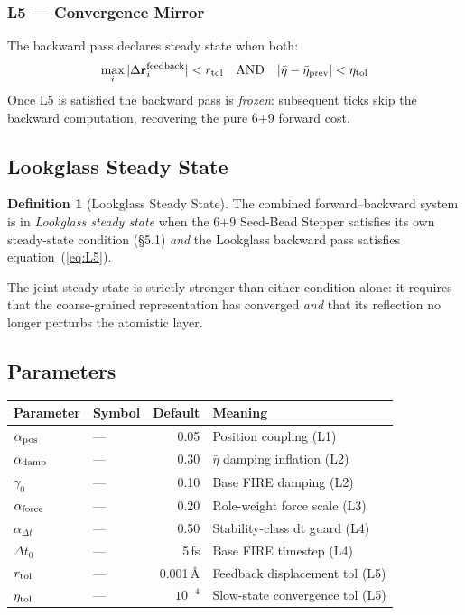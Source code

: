 \documentclass[11pt, a4paper, oneside]{article}
\theoremstyle{definition}
\newtheorem{definition}{Definition}[section]
\begin{document}
\subsubsection{L5 — Convergence Mirror}

The backward pass declares steady state when both:
%
\begin{equation}
  \max_i |\Delta\mathbf{r}_i^{\rm feedback}| < r_{\rm tol}
  \quad\text{AND}\quad
  |\bar\eta - \bar\eta_{\rm prev}| < \eta_{\rm tol}
  \label{eq:L5}
\end{equation}
%
Once L5 is satisfied the backward pass is \emph{frozen}: subsequent
ticks skip the backward computation, recovering the pure 6+9 forward
cost.

\subsection{Lookglass Steady State}

\begin{definition}[Lookglass Steady State]
  The combined forward–backward system is in \emph{Lookglass steady
  state} when the 6+9 Seed-Bead Stepper satisfies its own steady-state
  condition (§5.1) \emph{and} the Lookglass backward pass satisfies
  equation~(\ref{eq:L5}).
\end{definition}

The joint steady state is strictly stronger than either condition alone:
it requires that the coarse-grained representation has converged
\emph{and} that its reflection no longer perturbs the atomistic layer.

\subsection{Parameters}

\begin{center}
\begin{tabular}{llrl}
\toprule
Parameter & Symbol & Default & Meaning \\
\midrule
$\alpha_{\rm pos}$ & — & 0.05 & Position coupling (L1) \\
$\alpha_{\rm damp}$ & — & 0.30 & $\bar\eta$ damping inflation (L2) \\
$\gamma_0$ & — & 0.10 & Base FIRE damping (L2) \\
$\alpha_{\rm force}$ & — & 0.20 & Role-weight force scale (L3) \\
$\alpha_{\Delta t}$ & — & 0.50 & Stability-class dt guard (L4) \\
$\Delta t_0$ & — & 5\,fs & Base FIRE timestep (L4) \\
$r_{\rm tol}$ & — & 0.001\,\AA & Feedback displacement tol (L5) \\
$\eta_{\rm tol}$ & — & $10^{-4}$ & Slow-state convergence tol (L5) \\
\bottomrule
\end{tabular}
\end{center}
\end{document}
